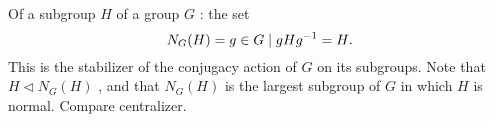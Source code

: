 Of a subgroup  $ H $  of a group  $ G $ : the
set  \[N_G(H)= \\{g \in G \mid gHg ^{-1}=H \\}. \]  This is the
stabilizer of the conjugacy action of  $ G $  on its
subgroups.  Note that  $ H \triangleleft N_G(H) $ , and that  $ N_G(H) $  is the
largest subgroup of  $ G $  in which  $ H $  is normal.  Compare centralizer.


